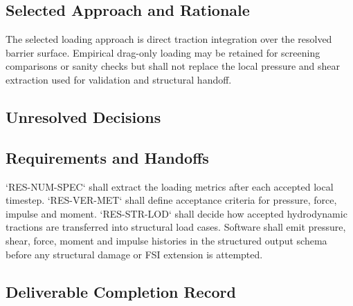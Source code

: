 
\subsection{Selected Approach and Rationale}
\label{sec:res-phy-lod-selected-approach}


The selected loading approach is direct traction integration over the
resolved barrier surface. Empirical drag-only loading may be retained
for screening comparisons or sanity checks but shall not replace the
local pressure and shear extraction used for validation and structural
handoff.

\subsection{Unresolved Decisions}
\label{sec:res-phy-lod-unresolved-decisions}


\subsection{Requirements and Handoffs}
\label{sec:res-phy-lod-requirements}


`RES-NUM-SPEC` shall extract the loading metrics after each accepted
local timestep. `RES-VER-MET` shall define acceptance criteria for
pressure, force, impulse and moment. `RES-STR-LOD` shall decide how
accepted hydrodynamic tractions are transferred into structural load
cases. Software shall emit pressure, shear, force, moment and impulse
histories in the structured output schema before any structural damage
or FSI extension is attempted.

\subsection{Deliverable Completion Record}
\label{sec:res-phy-lod-completion-record}

%
%
%

